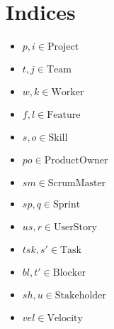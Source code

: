\documentclass[11pt]{article}
\begin{document}
\section{Indices}
\begin{itemize}
    \item $p, i \in \text{Project}$
    \item $t, j \in \text{Team}$
    \item $w, k \in \text{Worker}$
    \item $f, l \in \text{Feature}$
    \item $s, o \in \text{Skill}$
    \item $po \in \text{ProductOwner}$
    \item $sm \in \text{ScrumMaster}$
    \item $sp, q \in \text{Sprint}$
    \item $us, r \in \text{UserStory}$
    \item $tsk, s' \in \text{Task}$
    \item $bl, t' \in \text{Blocker}$
    \item $sh, u \in \text{Stakeholder}$
    \item $vel \in \text{Velocity}$
\end{itemize}
\end{document}
